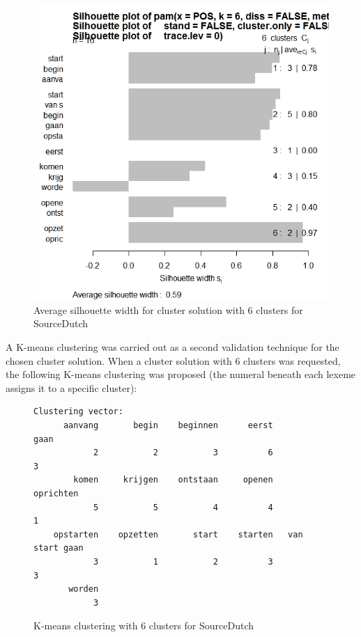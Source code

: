 \begin{figure}
\includegraphics[height=.4\textheight]{figures/Vandevoorde2-img53.png}
\caption{\label{fig:4:53}  Average silhouette width for cluster solution with 6 clusters for SourceDutch}
\end{figure}

A K-means clustering was carried out as a second validation technique for the chosen cluster solution. When a cluster solution with 6 clusters was requested, the following K-means clustering was proposed (the numeral beneath each lexeme assigns it to a specific cluster):
  
\begin{figure}
\footnotesize
\begin{lstlisting}
Clustering vector:
      aanvang       begin    beginnen      eerst             gaan 
            2           2           3          6                3         
        komen     krijgen    ontstaan     openen        oprichten         
            5           5           4          4                1         
    opstarten    opzetten       start    starten   van start gaan         
            3           1           2          3                3         
       worden                                            
            3                                      
\end{lstlisting}     

\caption{\label{fig:4:54}  K-means clustering with 6 clusters for SourceDutch}
\end{figure}

